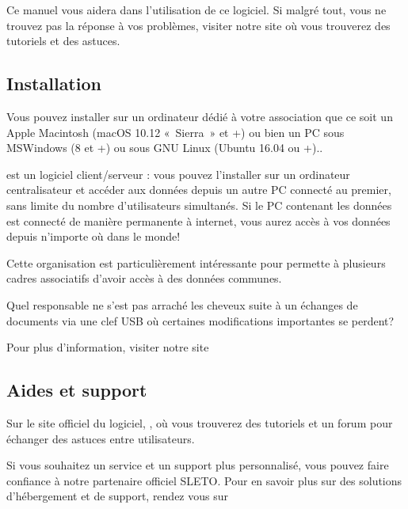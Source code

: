 \documentclass[a4paper,10pt,oneside,french]{sphinxmanual}
\begin{document}
\sphinxAtStartPar
Ce manuel vous aidera dans l’utilisation de ce logiciel.
Si malgré tout, vous ne trouvez pas la réponse à vos problèmes, visiter notre site  où vous trouverez des tutoriels et des astuces.


\subsection{Installation}
\label{\detokenize{pro/presentation:installation}}
\sphinxAtStartPar
Vous pouvez installer  sur un ordinateur dédié à votre association que ce soit un Apple Macintosh (macOS 10.12 « Sierra » et +) ou bien un PC sous MS\sphinxhyphen{}Windows (8 et +) ou sous GNU Linux (Ubuntu 16.04 ou +)..

\sphinxAtStartPar
{} est un logiciel client/serveur : vous pouvez l’installer sur un ordinateur centralisateur et accéder aux données depuis un autre PC connecté au premier, sans limite du nombre d’utilisateurs simultanés.
Si le PC contenant les données est connecté de manière permanente à internet, vous aurez accès à vos données depuis n’importe où dans le monde!

\sphinxAtStartPar
Cette organisation est particulièrement intéressante pour permette à plusieurs cadres associatifs d’avoir accès à des données communes.

\sphinxAtStartPar
Quel responsable ne s’est pas arraché les cheveux suite à un échanges de documents via une clef USB où certaines modifications importantes se perdent?

\sphinxAtStartPar
Pour plus d’information, visiter notre site 


\subsection{Aides et support}
\label{\detokenize{pro/presentation:aides-et-support}}
\sphinxAtStartPar
Sur le site officiel du logiciel, , où vous trouverez des tutoriels et un forum pour échanger des astuces entre utilisateurs.

\sphinxAtStartPar
Si vous souhaitez un service et un support plus personnalisé, vous pouvez faire confiance à notre partenaire officiel SLETO.
Pour en savoir plus sur des solutions d’hébergement et de support, rendez vous sur 

\sphinxstepscope
\end{document}
